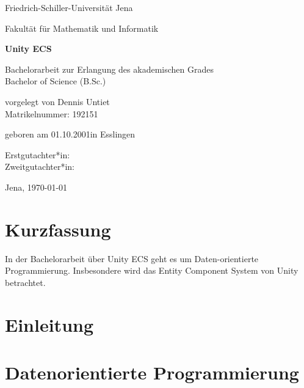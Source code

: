 \documentclass[12pt, titlepage]{article}
\newcommand{\myTitle}{Unity ECS}
\begin{document}
\begin{titlepage}
\centering
{\huge Friedrich-Schiller-Universität Jena \par}
{\large Fakultät für Mathematik und Informatik\par}
\vspace{1.5cm}
{\huge\bfseries \myTitle\par}
\vspace{2cm}
{\Large Bachelorarbeit zur Erlangung des akademischen Grades\\Bachelor of Science (B.Sc.) \par}
\vspace{3cm}
{\large vorgelegt von Dennis Untiet\\Matrikelnummer: 192151\par}
\vspace{0.5cm}
{\large geboren am 01.10.2001\quad in Esslingen\par}
\vspace{2cm}
{\large Erstgutachter*in:\\Zweitgutachter*in:\par} 
\vfill
{\Large Jena, \today}
\end{titlepage}
\section{Kurzfassung}
In der Bachelorarbeit über {\myTitle} geht es um Daten-orientierte Programmierung. Insbesondere wird das Entity Component System von Unity betrachtet.
\newpage
\tableofcontents
\newpage
\section{Einleitung}
\newpage
\section{Datenorientierte Programmierung}
\end{document}
